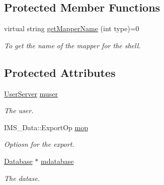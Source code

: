 \subsection*{Protected Member Functions}
\begin{DoxyCompactItemize}
\item 
\hypertarget{classExportServer_a494a243f2b86350d2b76b1b5643c3116}{
virtual string \hyperlink{classExportServer_a494a243f2b86350d2b76b1b5643c3116}{getMapperName} (int type)=0}
\label{classExportServer_a494a243f2b86350d2b76b1b5643c3116}

\begin{DoxyCompactList}\small\item\em To get the name of the mapper for the shell. \item\end{DoxyCompactList}\end{DoxyCompactItemize}
\subsection*{Protected Attributes}
\begin{DoxyCompactItemize}
\item 
\hypertarget{classExportServer_a32a72db97a80e0a6c8e30eb2dfa780fd}{
\hyperlink{classUserServer}{UserServer} \hyperlink{classExportServer_a32a72db97a80e0a6c8e30eb2dfa780fd}{muser}}
\label{classExportServer_a32a72db97a80e0a6c8e30eb2dfa780fd}

\begin{DoxyCompactList}\small\item\em The user. \item\end{DoxyCompactList}\item 
\hypertarget{classExportServer_a0ba380ea5eb3d4b2958241983dfd5ab5}{
IMS\_\-Data::ExportOp \hyperlink{classExportServer_a0ba380ea5eb3d4b2958241983dfd5ab5}{mop}}
\label{classExportServer_a0ba380ea5eb3d4b2958241983dfd5ab5}

\begin{DoxyCompactList}\small\item\em Optiosn for the export. \item\end{DoxyCompactList}\item 
\hypertarget{classExportServer_afbf336d9b71aa42c9135c2d5f65c3200}{
\hyperlink{classDatabase}{Database} $\ast$ \hyperlink{classExportServer_afbf336d9b71aa42c9135c2d5f65c3200}{mdatabase}}
\label{classExportServer_afbf336d9b71aa42c9135c2d5f65c3200}

\begin{DoxyCompactList}\small\item\em The datase. \item\end{DoxyCompactList}\end{DoxyCompactItemize}


